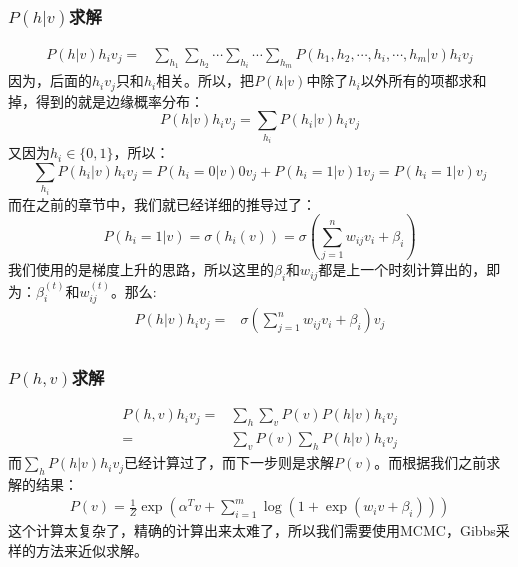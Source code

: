 \documentclass[a4paper]{article}
\begin{document}
\subsubsection{$P(h|v)$求解}
\begin{equation}
    \begin{split}
        P(h|v)h_iv_j = & \sum_{h_1}\sum_{h_2}\cdots\sum_{h_i}\cdots\sum_{h_m} P(h_1,h_2,\cdots,h_i,\cdots,h_m|v)h_iv_j
    \end{split}
\end{equation}
因为，后面的$h_iv_j$只和$h_i$相关。所以，把$P(h|v)$中除了$h_i$以外所有的项都求和掉，得到的就是边缘概率分布：
\begin{equation}
    P(h|v)h_iv_j = \sum_{h_i} P(h_i|v)h_iv_j
\end{equation}
又因为$h_i \in \{0,1\}$，所以：
\begin{equation}
    \sum_{h_i} P(h_i|v)h_iv_j = P(h_i=0|v)0v_j + P(h_i=1|v)1v_j = P(h_i=1|v)v_j
\end{equation}
而在之前的章节中，我们就已经详细的推导过了：
\begin{equation}
    P(h_i=1|v) = \sigma( h_i(v)) = \sigma(\sum_{j=1}^n w_{ij}v_i + \beta_i)
\end{equation}
我们使用的是梯度上升的思路，所以这里的$\beta_i$和$w_{ij}$都是上一个时刻计算出的，即为：$\beta_i^{(t)}$和$w_{ij}^{(t)}$。那么:
\begin{equation}
\begin{split}
    P(h|v)h_iv_j = & \sigma(\sum_{j=1}^n w_{ij}v_i + \beta_i) v_j \\
\end{split}
\end{equation}
\subsubsection{$P(h,v)$求解}
\begin{equation}
\begin{split}
    P(h,v)h_iv_j = & \sum_h\sum_v P(v)P(h|v) h_iv_j \\
    = & \sum_v P(v) \sum_h P(h|v) h_iv_j
\end{split}
\end{equation}
而$\sum_h P(h|v) h_iv_j$已经计算过了，而下一步则是求解$P(v)$。而根据我们之前求解的结果：
\begin{equation}
\begin{split}
    P(v) = \frac{1}{Z} \exp\left(\alpha^T v + \sum_{i=1}^m \log ( 1+\exp(w_iv+\beta_i)) \right)
\end{split}
\end{equation}
这个计算太复杂了，精确的计算出来太难了，所以我们需要使用MCMC，Gibbs采样的方法来近似求解。
\end{document}
